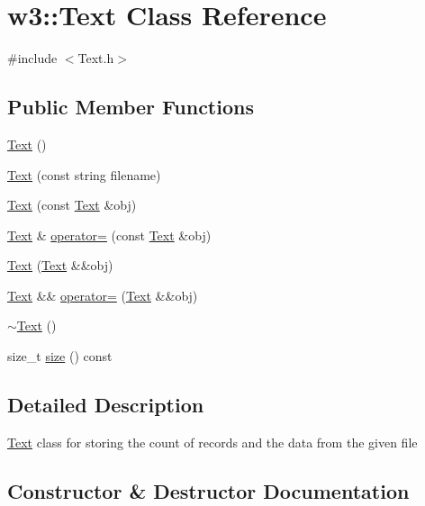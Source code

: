 \hypertarget{classw3_1_1Text}{}\section{w3\+:\+:Text Class Reference}
\label{classw3_1_1Text}


{\ttfamily \#include $<$Text.\+h$>$}

\subsection*{Public Member Functions}
\begin{DoxyCompactItemize}
\item 
\mbox{\hyperlink{classw3_1_1Text_a246f1f28a131ed236fe0855ee52675c8}{Text}} ()
\item 
\mbox{\hyperlink{classw3_1_1Text_a365bf91aafc082849a051a9bd0d1285b}{Text}} (const string filename)
\item 
\mbox{\hyperlink{classw3_1_1Text_ac5b14dd6e2d9ee9876ea8501d75d1a10}{Text}} (const \mbox{\hyperlink{classw3_1_1Text}{Text}} \&obj)
\item 
\mbox{\hyperlink{classw3_1_1Text}{Text}} \& \mbox{\hyperlink{classw3_1_1Text_a1b87c67fdf7be218346e20308a3e3c11}{operator=}} (const \mbox{\hyperlink{classw3_1_1Text}{Text}} \&obj)
\item 
\mbox{\hyperlink{classw3_1_1Text_ad3f20b7b4394c26c0a2addcbf77e58fb}{Text}} (\mbox{\hyperlink{classw3_1_1Text}{Text}} \&\&obj)
\item 
\mbox{\hyperlink{classw3_1_1Text}{Text}} \&\& \mbox{\hyperlink{classw3_1_1Text_ae65528850526faf4beda6631b2c6d2f0}{operator=}} (\mbox{\hyperlink{classw3_1_1Text}{Text}} \&\&obj)
\item 
\mbox{\hyperlink{classw3_1_1Text_a599c6614ba05c4cbd3ef9b8968a73ad4}{$\sim$\+Text}} ()
\item 
size\+\_\+t \mbox{\hyperlink{classw3_1_1Text_aa738305950f5a5def3c56b98dcc5e14a}{size}} () const
\end{DoxyCompactItemize}


\subsection{Detailed Description}
\mbox{\hyperlink{classw3_1_1Text}{Text}} class for storing the count of records and the data from the given file 

\subsection{Constructor \& Destructor Documentation}
\mbox{\label{classw3_1_1Text_a246f1f28a131ed236fe0855ee52675c8}} 

